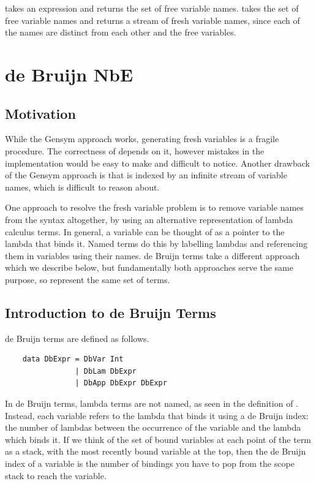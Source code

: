  takes an expression and returns the set of free variable names.  takes the set of free variable names and returns a stream of fresh variable names, since each of the names are distinct from each other and the free variables.

\section{de Bruijn NbE}

\subsection{Motivation}

While the Gensym approach works, generating fresh variables is a fragile procedure. The correctness of  depends on it, however mistakes in the implementation would be easy to make and difficult to notice. Another drawback of the Gensym approach is that  is indexed by an infinite stream of variable names, which is difficult to reason about.

One approach to resolve the fresh variable problem is to remove variable names from the syntax altogether, by using an alternative representation of lambda calculus terms. In general, a variable can be thought of as a pointer to the lambda that binds it. Named terms do this by labelling lambdas and referencing them in variables using their names. de Bruijn terms take a different approach which we describe below, but fundamentally both approaches serve the same purpose, so represent the same set of terms.

\subsection{Introduction to de Bruijn Terms}

de Bruijn terms are defined as follows. \cite{deBruijnNotation}

\begin{lstlisting}
    data DbExpr = DbVar Int
                | DbLam DbExpr
                | DbApp DbExpr DbExpr
\end{lstlisting}

In de Bruijn terms, lambda terms are not named, as seen in the definition of . Instead, each variable refers to the lambda that binds it using a de Bruijn index: the number of lambdas between the occurrence of the variable and the lambda which binds it. If we think of the set of bound variables at each point of the term as a stack, with the most recently bound variable at the top, then the de Bruijn index of a variable is the number of bindings you have to pop from the scope stack to reach the variable.

